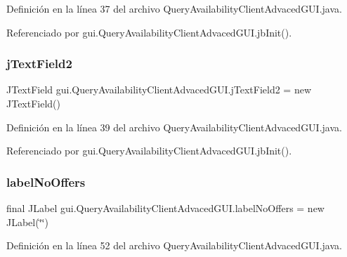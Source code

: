 Definición en la línea 37 del archivo Query\+Availability\+Client\+Advaced\+G\+U\+I.\+java.



Referenciado por gui.\+Query\+Availability\+Client\+Advaced\+G\+U\+I.\+jb\+Init().

\mbox{\label{classgui_1_1_query_availability_client_advaced_g_u_i_adf1c51e6e9479b73b5f239eb1af49790}} 
\subsubsection{\texorpdfstring{jTextField2}{jTextField2}}
{\footnotesize\ttfamily J\+Text\+Field gui.\+Query\+Availability\+Client\+Advaced\+G\+U\+I.\+j\+Text\+Field2 = new J\+Text\+Field()\hspace{0.3cm}{\ttfamily [private]}}



Definición en la línea 39 del archivo Query\+Availability\+Client\+Advaced\+G\+U\+I.\+java.



Referenciado por gui.\+Query\+Availability\+Client\+Advaced\+G\+U\+I.\+jb\+Init().

\mbox{\label{classgui_1_1_query_availability_client_advaced_g_u_i_a4de669b611d113ec3d2566c7f52a34ca}} 
\subsubsection{\texorpdfstring{labelNoOffers}{labelNoOffers}}
{\footnotesize\ttfamily final J\+Label gui.\+Query\+Availability\+Client\+Advaced\+G\+U\+I.\+label\+No\+Offers = new J\+Label(\char`\"{}\char`\"{})\hspace{0.3cm}{\ttfamily [private]}}



Definición en la línea 52 del archivo Query\+Availability\+Client\+Advaced\+G\+U\+I.\+java.



